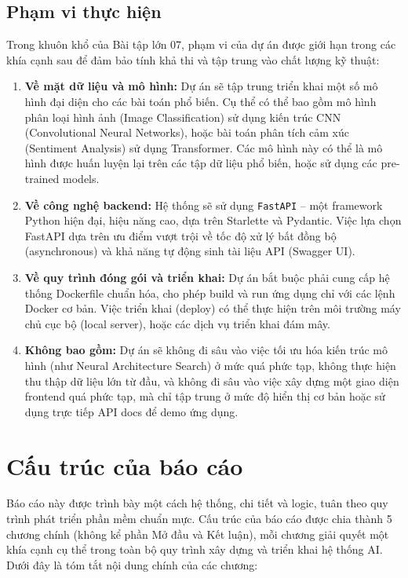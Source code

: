 \subsection{Phạm vi thực hiện}

Trong khuôn khổ của Bài tập lớn 07, phạm vi của dự án được giới hạn trong các khía cạnh sau để đảm bảo tính khả thi và tập trung vào chất lượng kỹ thuật:
\begin{enumerate}
    \item \textbf{Về mặt dữ liệu và mô hình:} Dự án sẽ tập trung triển khai một số mô hình đại diện cho các bài toán phổ biến. Cụ thể có thể bao gồm mô hình phân loại hình ảnh (Image Classification) sử dụng kiến trúc CNN (Convolutional Neural Networks), hoặc bài toán phân tích cảm xúc (Sentiment Analysis) sử dụng Transformer. Các mô hình này có thể là mô hình được huấn luyện lại trên các tập dữ liệu phổ biến, hoặc sử dụng các pre-trained models.
    \item \textbf{Về công nghệ backend:} Hệ thống sẽ sử dụng \texttt{FastAPI} – một framework Python hiện đại, hiệu năng cao, dựa trên Starlette và Pydantic. Việc lựa chọn FastAPI dựa trên ưu điểm vượt trội về tốc độ xử lý bất đồng bộ (asynchronous) và khả năng tự động sinh tài liệu API (Swagger UI).
    \item \textbf{Về quy trình đóng gói và triển khai:} Dự án bắt buộc phải cung cấp hệ thống Dockerfile chuẩn hóa, cho phép build và run ứng dụng chỉ với các lệnh Docker cơ bản. Việc triển khai (deploy) có thể thực hiện trên môi trường máy chủ cục bộ (local server), hoặc các dịch vụ triển khai đám mây.
    \item \textbf{Không bao gồm:} Dự án sẽ không đi sâu vào việc tối ưu hóa kiến trúc mô hình (như Neural Architecture Search) ở mức quá phức tạp, không thực hiện thu thập dữ liệu lớn từ đầu, và không đi sâu vào việc xây dựng một giao diện frontend quá phức tạp, mà chỉ tập trung ở mức độ hiển thị cơ bản hoặc sử dụng trực tiếp API docs để demo ứng dụng.
\end{enumerate}

\newpage
\section{Cấu trúc của báo cáo}

Báo cáo này được trình bày một cách hệ thống, chi tiết và logic, tuân theo quy trình phát triển phần mềm chuẩn mực. Cấu trúc của báo cáo được chia thành 5 chương chính (không kể phần Mở đầu và Kết luận), mỗi chương giải quyết một khía cạnh cụ thể trong toàn bộ quy trình xây dựng và triển khai hệ thống AI. Dưới đây là tóm tắt nội dung chính của các chương:

